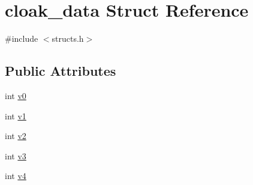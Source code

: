 \hypertarget{structcloak__data}{\section{cloak\-\_\-data Struct Reference}
\label{structcloak__data}
}


{\ttfamily \#include $<$structs.\-h$>$}

\subsection*{Public Attributes}
\begin{DoxyCompactItemize}
\item 
int \hyperlink{structcloak__data_ac03f2d5a6d39bf86536510bf281ab290}{v0}
\item 
int \hyperlink{structcloak__data_aa14643185983f41355d57b0b9f4f8d46}{v1}
\item 
int \hyperlink{structcloak__data_aa5e54b5d7071e02a581624202be18133}{v2}
\item 
int \hyperlink{structcloak__data_ac95cd6f056c8c9fb82a8bbc8fae85e99}{v3}
\item 
int \hyperlink{structcloak__data_a426344db5e5d372d8f0d70269ed6faad}{v4}
\end{DoxyCompactItemize}


